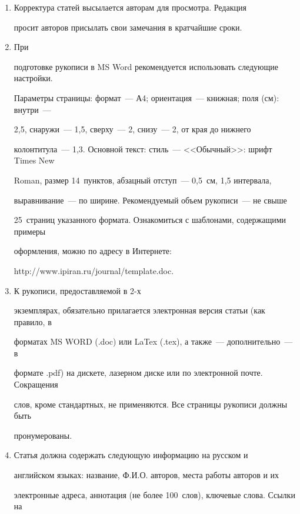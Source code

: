 {{\begin{enumerate}
редакционной коллегии о принятии статьи к печати или ее отклонении сообщается


авторам. Редколлегия не обязуется направлять рецензию авторам отклоненной


статьи.


\item Корректура статей высылается авторам для просмотра. Редакция


просит авторов присылать свои замечания в кратчайшие сроки.


\item При


подготовке рукописи в MS Word рекомендуется использовать следующие настройки.


Параметры страницы: формат~--- А4; ориентация~--- книжная; поля (см): внутри~---


2,5, снаружи~--- 1,5, сверху~--- 2, снизу~--- 2, от края до нижнего


колонтитула~--- 1,3. Основной текст: стиль~--- <<Обычный>>: шрифт Times New


Roman, размер 14~пунктов, абзацный отступ~--- 0,5~см, 1,5 интервала,


выравнивание~--- по ширине. Рекомендуемый объем рукописи~--- не свыше


25~страниц указанного формата. Ознакомиться с шаблонами, содержащими примеры


оформления, можно по адресу в Интернете:


\textsf{http://www.ipiran.ru/journal/template.doc}.


\item К рукописи, предоставляемой в 2-х


экземплярах, обязательно прилагается электронная версия статьи (как правило, в


форматах MS WORD (.doc) или LaTex (.tex), а также~--- дополнительно~--- в


формате .pdf) на дискете, лазерном диске или по электронной почте. Сокращения


слов, кроме стандартных, не применяются. Все страницы рукописи должны быть


пронумерованы.


\item Статья должна содержать следующую информацию на русском и


английском языках: название, Ф.И.О. авторов, места работы авторов и их


электронные адреса, аннотация (не более 100~слов), ключевые слова. Ссылки на



\end{enumerate}}}
